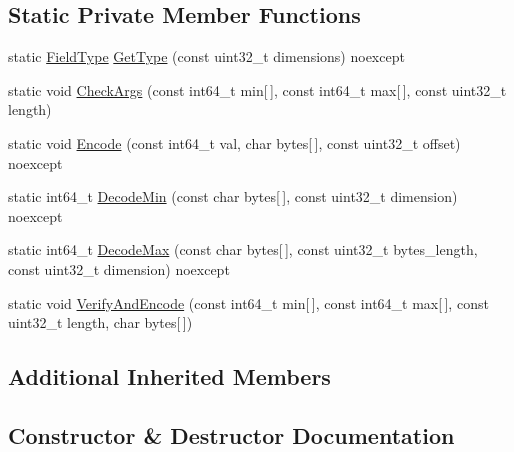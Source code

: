 \subsection*{Static Private Member Functions}
\begin{DoxyCompactItemize}
\item 
static \mbox{\hyperlink{classlucene_1_1core_1_1document_1_1FieldType}{Field\+Type}} \mbox{\hyperlink{classlucene_1_1core_1_1document_1_1LongRange_a57ee0b920b7c4103d4ac63511762deb9}{Get\+Type}} (const uint32\+\_\+t dimensions) noexcept
\item 
static void \mbox{\hyperlink{classlucene_1_1core_1_1document_1_1LongRange_aa40ee6dae88377490b2ee570d9ff84bf}{Check\+Args}} (const int64\+\_\+t min\mbox{[}$\,$\mbox{]}, const int64\+\_\+t max\mbox{[}$\,$\mbox{]}, const uint32\+\_\+t length)
\item 
static void \mbox{\hyperlink{classlucene_1_1core_1_1document_1_1LongRange_a3b63010820b45954c66489d43ee75321}{Encode}} (const int64\+\_\+t val, char bytes\mbox{[}$\,$\mbox{]}, const uint32\+\_\+t offset) noexcept
\item 
static int64\+\_\+t \mbox{\hyperlink{classlucene_1_1core_1_1document_1_1LongRange_ac11a9f4800961cf1edaad2ba9d77c5f5}{Decode\+Min}} (const char bytes\mbox{[}$\,$\mbox{]}, const uint32\+\_\+t dimension) noexcept
\item 
static int64\+\_\+t \mbox{\hyperlink{classlucene_1_1core_1_1document_1_1LongRange_ae16e60bb4f29ab3c1b2a2261addbbe50}{Decode\+Max}} (const char bytes\mbox{[}$\,$\mbox{]}, const uint32\+\_\+t bytes\+\_\+length, const uint32\+\_\+t dimension) noexcept
\item 
static void \mbox{\hyperlink{classlucene_1_1core_1_1document_1_1LongRange_acc112551134a7e54e9480e3ef5dca2d0}{Verify\+And\+Encode}} (const int64\+\_\+t min\mbox{[}$\,$\mbox{]}, const int64\+\_\+t max\mbox{[}$\,$\mbox{]}, const uint32\+\_\+t length, char bytes\mbox{[}$\,$\mbox{]})
\end{DoxyCompactItemize}
\subsection*{Additional Inherited Members}


\subsection{Constructor \& Destructor Documentation}
\mbox{\label{classlucene_1_1core_1_1document_1_1LongRange_a7f20f8b15104f6ea7e3cab36310ce777}} 
